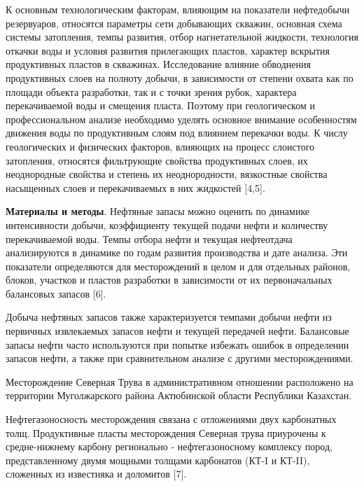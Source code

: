 \begin{multicols}{2}
К основным технологическим факторам, влияющим на показатели нефтедобычи
резервуаров, относятся параметры сети добывающих скважин, основная схема
системы затопления, темпы развития, отбор нагнетательной жидкости,
технология откачки воды и условия развития прилегающих пластов, характер
вскрытия продуктивных пластов в скважинах. Исследование влияние
обводнения продуктивных слоев на полноту добычи, в зависимости от
степени охвата как по площади объекта разработки, так и с точки зрения
рубок, характера перекачиваемой воды и смещения пласта. Поэтому при
геологическом и профессиональном анализе необходимо уделять основное
внимание особенностям движения воды по продуктивным слоям под влиянием
перекачки воды. К числу геологических и физических факторов, влияющих на
процесс слоистого затопления, относятся фильтрующие свойства
продуктивных слоев, их неоднородные свойства и степень их
неоднородности, вязкостные свойства насыщенных слоев и перекачиваемых в
них жидкостей {[}4,5{]}.

{\bfseries Материалы и методы}. Нефтяные запасы можно оценить по динамике
интенсивности добычи, коэффициенту текущей подачи нефти и количеству
перекачиваемой воды. Темпы отбора нефти и текущая нефтеотдача
анализируются в динамике по годам развития производства и дате анализа.
Эти показатели определяются для месторождений в целом и для отдельных
районов, блоков, участков и пластов разработки в зависимости от их
первоначальных балансовых запасов {[}6{]}.

Добыча нефтяных запасов также характеризуется темпами добычи нефти из
первичных извлекаемых запасов нефти и текущей передачей нефти.
Балансовые запасы нефти часто используются при попытке избежать ошибок в
определении запасов нефти, а также при сравнительном анализе с другими
месторождениями.

Месторождение Северная Трува в административном отношении расположено на
территории Муголжарского района Актюбинской области Республики
Казахстан.

Нефтегазоносность месторождения связана с отложениями двух карбонатных
толщ. Продуктивные пласты месторождения Северная трува приурочены к
средне-нижнему карбону регионально - нефтегазоносному комплексу пород,
представленному двумя мощными толщами карбонатов (КТ-I и КТ-II),
сложенных из известняка и доломитов {[}7{]}.
\end{multicols}

